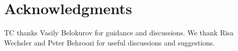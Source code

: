 \documentclass[useAMS,usenatbib]{mn2e}
\begin{document}










\section*{Acknowledgments}
 
TC thanks Vasily Belokurov for guidance and discussions.
We thank Risa Wechsler and Peter Behroozi for useful discussions and 
suggestions.



\appendix
\end{document}
